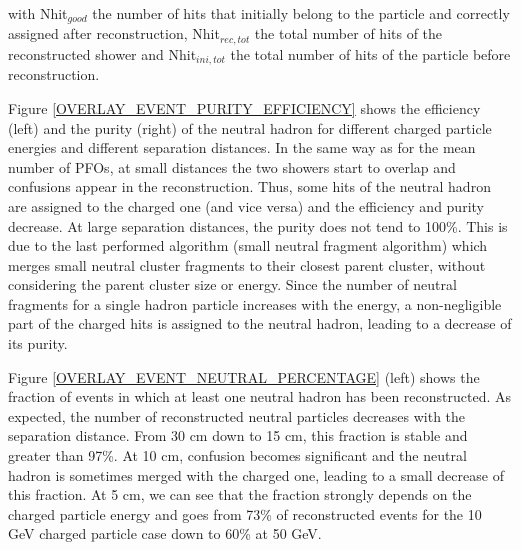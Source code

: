 \documentclass[cits]{JINST}
\begin{document}
with Nhit$_{good}$ the number of hits that initially belong to the particle and correctly assigned after reconstruction, Nhit$_{rec,tot}$ the total number of hits of the reconstructed shower and Nhit$_{ini,tot}$ the total number of hits of the particle before reconstruction. 

Figure \ref{OVERLAY_EVENT_PURITY_EFFICIENCY} shows the efficiency (left) and the purity (right) of the neutral hadron for different charged particle energies and different separation distances. In the same way as for the mean number of PFOs, at small distances the two showers start to overlap and confusions appear in the reconstruction. Thus, some hits of the neutral hadron are assigned to the charged one (and vice versa) and the efficiency and purity decrease. At large separation distances, the purity does not tend to 100\%. This is due to the last performed algorithm (small neutral fragment algorithm) which merges small neutral cluster fragments to their closest parent cluster, without considering the parent cluster size or energy. Since the number of neutral fragments for a single hadron particle increases with the energy, a non-negligible part of the charged hits is assigned to the neutral hadron, leading to a decrease of its purity.

Figure \ref{OVERLAY_EVENT_NEUTRAL_PERCENTAGE} (left) shows the fraction of events in which at least one neutral hadron has been reconstructed. As expected, the number of reconstructed neutral particles decreases with the separation distance. From 30 cm down to 15 cm, this fraction is stable and greater than 97\%. At 10 cm, confusion becomes significant and the neutral hadron is sometimes merged with the charged one, leading to a small decrease of this fraction. At 5 cm, we can see that the fraction strongly depends on the charged particle energy and goes from 73\% of reconstructed events for the 10 GeV charged particle case down to 60\% at 50 GeV.
\end{document}

